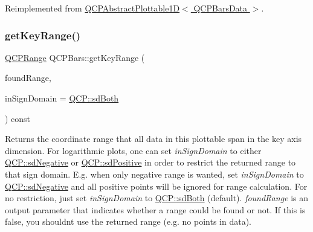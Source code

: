 Reimplemented from \hyperlink{class_q_c_p_abstract_plottable1_d_a14cf167457cda163575e6eec2a0b178d}{Q\+C\+P\+Abstract\+Plottable1\+D$<$ Q\+C\+P\+Bars\+Data $>$}.

\mbox{\label{class_q_c_p_bars_ac5a3854774d9d9cd129b1eae1426de2d}} 
\subsubsection{\texorpdfstring{get\+Key\+Range()}{getKeyRange()}\hspace{0.1cm}{\footnotesize\ttfamily [1/2]}}
{\footnotesize\ttfamily \hyperlink{class_q_c_p_range}{Q\+C\+P\+Range} Q\+C\+P\+Bars\+::get\+Key\+Range (\begin{DoxyParamCaption}\item[{bool \&}]{found\+Range,  }\item[{\hyperlink{namespace_q_c_p_afd50e7cf431af385614987d8553ff8a9}{Q\+C\+P\+::\+Sign\+Domain}}]{in\+Sign\+Domain = {\ttfamily \hyperlink{namespace_q_c_p_afd50e7cf431af385614987d8553ff8a9a3dee7e9cd2fedce9253b83e172626a6c}{Q\+C\+P\+::sd\+Both}} }\end{DoxyParamCaption}) const\hspace{0.3cm}{\ttfamily [virtual]}}

Returns the coordinate range that all data in this plottable span in the key axis dimension. For logarithmic plots, one can set {\itshape in\+Sign\+Domain} to either \hyperlink{namespace_q_c_p_afd50e7cf431af385614987d8553ff8a9a0b464fa3135be2808909739a969193c9}{Q\+C\+P\+::sd\+Negative} or \hyperlink{namespace_q_c_p_afd50e7cf431af385614987d8553ff8a9a23362334a52289677a51526a9b68db6c}{Q\+C\+P\+::sd\+Positive} in order to restrict the returned range to that sign domain. E.\+g. when only negative range is wanted, set {\itshape in\+Sign\+Domain} to \hyperlink{namespace_q_c_p_afd50e7cf431af385614987d8553ff8a9a0b464fa3135be2808909739a969193c9}{Q\+C\+P\+::sd\+Negative} and all positive points will be ignored for range calculation. For no restriction, just set {\itshape in\+Sign\+Domain} to \hyperlink{namespace_q_c_p_afd50e7cf431af385614987d8553ff8a9a3dee7e9cd2fedce9253b83e172626a6c}{Q\+C\+P\+::sd\+Both} (default). {\itshape found\+Range} is an output parameter that indicates whether a range could be found or not. If this is false, you shouldn\textquotesingle{}t use the returned range (e.\+g. no points in data).

